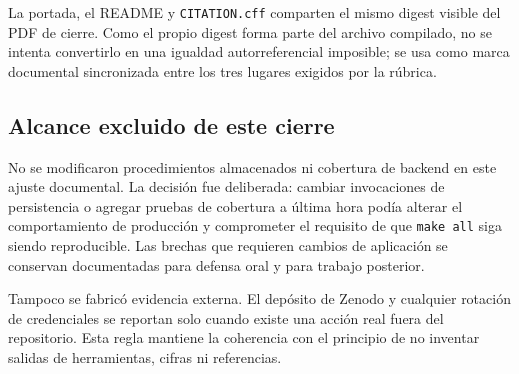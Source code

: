 La portada, el README y \texttt{CITATION.cff} comparten el mismo digest
visible del PDF de cierre. Como el propio digest forma parte del archivo
compilado, no se intenta convertirlo en una igualdad autorreferencial
imposible; se usa como marca documental sincronizada entre los tres
lugares exigidos por la rúbrica.

\subsection*{Alcance excluido de este cierre}

No se modificaron procedimientos almacenados ni cobertura de backend en
este ajuste documental. La decisión fue deliberada: cambiar invocaciones
de persistencia o agregar pruebas de cobertura a última hora podía
alterar el comportamiento de producción y comprometer el requisito de que
\texttt{make all} siga siendo reproducible. Las brechas que requieren
cambios de aplicación se conservan documentadas para defensa oral y para
trabajo posterior.

Tampoco se fabricó evidencia externa. El depósito de Zenodo y cualquier
rotación de credenciales se reportan solo cuando existe una acción real
fuera del repositorio. Esta regla mantiene la coherencia con el principio
de no inventar salidas de herramientas, cifras ni referencias.
